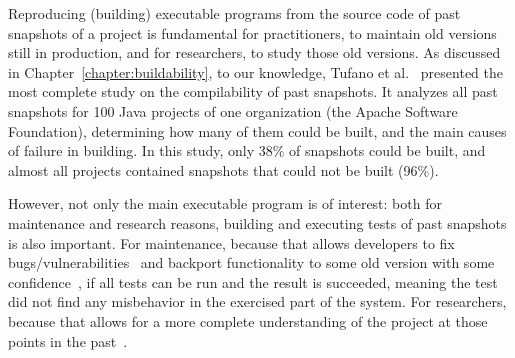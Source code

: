 
Reproducing (building) executable programs from the source code of past snapshots
 of a project is fundamental for practitioners, to maintain old versions still in production, and for researchers, to study those old versions. 
As discussed in Chapter~\ref{chapter:buildability}, to our knowledge, Tufano et al.~\cite{tufano2017there} presented the most complete study on the compilability of past snapshots.
It analyzes all past snapshots for 100 Java projects of one organization (the Apache Software Foundation), determining how many of them could be built, and the main causes of failure in building. 
In this study, only 38\% of snapshots could be built, and almost all projects contained snapshots that could not be built (96\%).

However, not only the main executable program is of interest: both for maintenance and research reasons, building and executing tests of past snapshots is also important. 
For maintenance, because that allows developers to fix bugs/vulnerabilities~\cite{bartelsoftware} and backport functionality to some old version with some confidence~\cite{tian2017mining}, if all tests can be run and the result is succeeded, meaning the test did not find any misbehavior in the exercised part of the system. 
For researchers, because that allows for a more complete understanding of the project at those points in the past~\cite{santos2019mind}.



